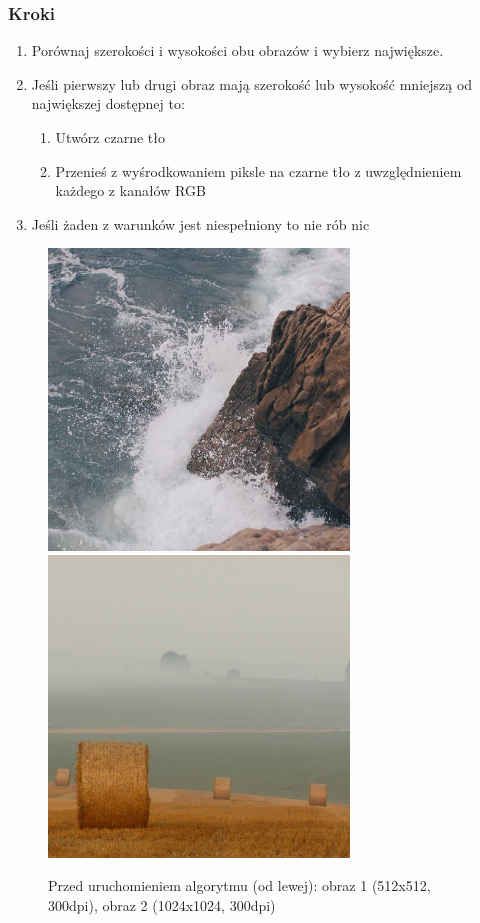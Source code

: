 \documentclass[a4paper,12pt]{book}
\begin{document}
\subsubsection*{Kroki}
\begin{enumerate}
	\item Porównaj szerokości i wysokości obu obrazów i wybierz największe. 
	\item Jeśli pierwszy lub drugi obraz mają szerokość lub wysokość mniejszą od największej dostępnej to:
	\begin{enumerate}
		\item Utwórz czarne tło
		\item Przenieś z wyśrodkowaniem piksle na czarne tło z uwzględnieniem każdego z kanałów RGB
	\end{enumerate}
	\item Jeśli żaden z warunków jest niespełniony to nie rób nic
\end{enumerate}
\begin{figure}
	\caption{Przed uruchomieniem algorytmu (od lewej): obraz 1 (512x512, 300dpi), obraz 2 (1024x1024, 300dpi)}
	\includegraphics[width=8cm, height=8cm]{sea-unmodified.jpg}
	\includegraphics[width=8cm, height=8cm]{field-unmodified.jpg}
\end{figure}
\end{document}

